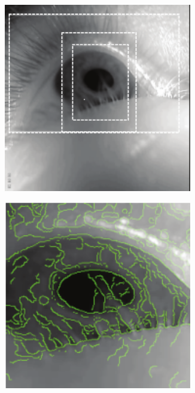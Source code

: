 \documentclass[USenglish,twocolumn]{article}
\begin{document}
\begin{figure}[H]
	\captionsetup[subfigure]{justification=centering}
	\centering
	\begin{subfigure}[b]{0.15\textwidth}
		\centering
		\includegraphics[width=0.9\textwidth]{img/PupilLab/1.png}
		\caption{}
		\label{fig:pupilLab1}
	\end{subfigure}%
	\begin{subfigure}[b]{0.15\textwidth}
		\centering
		\includegraphics[width=0.9\textwidth]{img/PupilLab/2.png}

\end{subfigure}
\end{figure}
\end{document}

